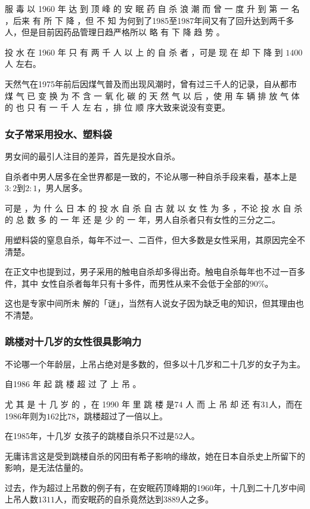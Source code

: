 \documentclass[UTF8]{ctexart}
\begin{document}
服 毒 以 1960 年 达 到 顶 峰 的 安 眠 药 自 杀 浪 潮 而 曾 一 度 升 到 第 一 名 ，后来 有 所 下 降 ，但 不 知 为何到了1985至1987年间又有了回升达到两千多人，但是目前因药品管理日趋严格所以 略 有 下 降 趋 势 。

投 水 在 1960 年 只 有 两 千 人 以 上 的 自 杀 者 ，可是 现 在 却 下 降 到 $1400$ 人 左右。

天然气在1975年前后因煤气普及而出现风潮时，曾有过三千人的记录，自从都市 煤 气 已 变 换 为 不 含 一 氧 化 碳 的 天 然 气 以 后 ，使 用 车 辆 排 放 气 体 的 也 只 有 一 千 人 左 右 ，排 位 顺 序大致来说没有变更。

\subsubsection*{女子常采用投水、塑料袋}

男女间的最引人注目的差异，首先是投水自杀。

自杀者中男人居多在全世界都是一致的，不论从哪一种自杀手段来看，基本上是$3:2$到$2:1$，男人居多。

可是 ，为 什 么 日 本 的 投 水 自 杀 自 古 就 以 女 性 为 多 ，不论 投 水 自 杀 的 总 数 多 的 一 年 还 是 少 的 一 年，男人自杀者只有女性的三分之二。

用塑料袋的窒息自杀，每年不过一、二百件，但大多数是女性采用，其原因完全不清楚。

在正文中也提到过，男子采用的触电自杀却多得出奇。触电自杀每年也不过一百多件，其中 女性自杀者每年只有十多件，而男性从来不会低于全部的$90\%$。

这也是专家中间所未 解的「谜」，当然有人说女子因为缺乏电的知识，但其理由也不清楚。

\subsubsection*{跳楼对十几岁的女性很具影响力}

不论哪一个年龄层，上吊占绝对是多数的，但多以十几岁和二十几岁的女子为主。

自1986 年 起 跳 楼 超 过 了 上 吊 。

尤 其 是 十 几 岁 的 ，在 1990 年 里 跳 楼 是$74$ 人 而 上 吊 却 还 有$31$人，而在1986年则为$162$比$78$，跳楼超过了一倍以上。

在1985年，十几岁 女孩子的跳楼自杀只不过是$52$人。

无庸讳言这是受到跳楼自杀的冈田有希子影响的缘故，她在日本自杀史上所留下的影响，是无法估量的。

过去，作为超过上吊数的例子有，在安眠药顶峰期的1960年，十几到二十几岁中间上吊人数$1311$人，而安眠药的自杀竟然达到$3889$人之多。
\end{document}
